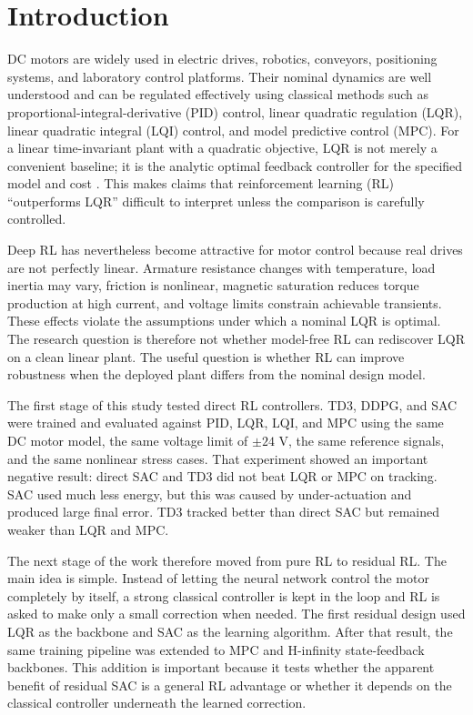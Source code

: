 \documentclass[conference]{IEEEtran}
\begin{document}
\section{Introduction}
DC motors are widely used in electric drives, robotics, conveyors, positioning systems, and laboratory control platforms. Their nominal dynamics are well understood and can be regulated effectively using classical methods such as proportional-integral-derivative (PID) control, linear quadratic regulation (LQR), linear quadratic integral (LQI) control, and model predictive control (MPC). For a linear time-invariant plant with a quadratic objective, LQR is not merely a convenient baseline; it is the analytic optimal feedback controller for the specified model and cost \cite{kalman1960,anderson1971}. This makes claims that reinforcement learning (RL) ``outperforms LQR'' difficult to interpret unless the comparison is carefully controlled.

Deep RL has nevertheless become attractive for motor control because real drives are not perfectly linear. Armature resistance changes with temperature, load inertia may vary, friction is nonlinear, magnetic saturation reduces torque production at high current, and voltage limits constrain achievable transients. These effects violate the assumptions under which a nominal LQR is optimal. The research question is therefore not whether model-free RL can rediscover LQR on a clean linear plant. The useful question is whether RL can improve robustness when the deployed plant differs from the nominal design model.

The first stage of this study tested direct RL controllers. TD3, DDPG, and SAC were trained and evaluated against PID, LQR, LQI, and MPC using the same DC motor model, the same voltage limit of $\pm 24$ V, the same reference signals, and the same nonlinear stress cases. That experiment showed an important negative result: direct SAC and TD3 did not beat LQR or MPC on tracking. SAC used much less energy, but this was caused by under-actuation and produced large final error. TD3 tracked better than direct SAC but remained weaker than LQR and MPC.

The next stage of the work therefore moved from pure RL to residual RL. The main idea is simple. Instead of letting the neural network control the motor completely by itself, a strong classical controller is kept in the loop and RL is asked to make only a small correction when needed. The first residual design used LQR as the backbone and SAC as the learning algorithm. After that result, the same training pipeline was extended to MPC and H-infinity state-feedback backbones. This addition is important because it tests whether the apparent benefit of residual SAC is a general RL advantage or whether it depends on the classical controller underneath the learned correction.
\end{document}

